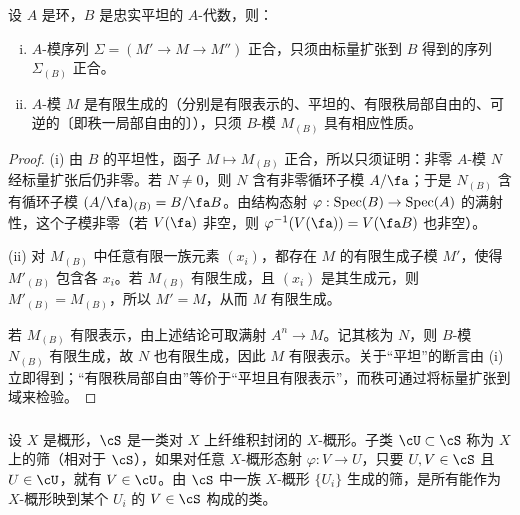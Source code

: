 \begin{proposition}\label{I:1-4-2}
设 $A$ 是环，$B$ 是忠实平坦的 $A$-代数，则：
\begin{enumerate}[(i)]
\item $A$-模序列 $\Sigma=(M'\to M\to M'')$ 正合，只须由标量扩张到 $B$ 得到的序列 $\Sigma_{(B)}$ 正合。
\item $A$-模 $M$ 是有限生成的（分别是有限表示的、平坦的、有限秩局部自由的、可逆的〔即秩一局部自由的〕），只须 $B$-模 $M_{(B)}$ 具有相应性质。
\end{enumerate}
\end{proposition}
\begin{proof}
(i) 由 $B$ 的平坦性，函子 $M\mapsto M_{(B)}$ 正合，所以只须证明：非零 $A$-模 $N$ 经标量扩张后仍非零。若 $N\ne0$，则 $N$ 含有非零循环子模 $A/\fa$；于是 $N_{(B)}$ 含有循环子模 $(A/\fa)_{(B)}=B/\fa B$。由结构态射 $\varphi:\operatorname{Spec}(B)\to\operatorname{Spec}(A)$ 的满射性，这个子模非零（若 $V(\fa)$ 非空，则 $\varphi^{-1}(V(\fa))=V(\fa B)$ 也非空）。

(ii) 对 $M_{(B)}$ 中任意有限一族元素 $(x_i)$，都存在 $M$ 的有限生成子模 $M'$，使得 $M'_{(B)}$ 包含各 $x_i$。若 $M_{(B)}$ 有限生成，且 $(x_i)$ 是其生成元，则 $M'_{(B)}=M_{(B)}$，所以 $M'=M$，从而 $M$ 有限生成。

若 $M_{(B)}$ 有限表示，由上述结论可取满射 $A^n\to M$。记其核为 $N$，则 $B$-模 $N_{(B)}$ 有限生成，故 $N$ 也有限生成，因此 $M$ 有限表示。关于“平坦”的断言由 (i) 立即得到；“有限秩局部自由”等价于“平坦且有限表示”，而秩可通过将标量扩张到域来检验。
\end{proof}

\subsubsection{}\label{I:1-4-3}
设 $X$ 是概形，$\cS$ 是一类对 $X$ 上纤维积封闭的 $X$-概形。子类 $\cU\subset\cS$ 称为 $X$ 上的筛（相对于 $\cS$），如果对任意 $X$-概形态射 $\varphi:V\to U$，只要 $U,V\in\cS$ 且 $U\in\cU$，就有 $V\in\cU$。由 $\cS$ 中一族 $X$-概形 $\{U_i\}$ 生成的筛，是所有能作为 $X$-概形映到某个 $U_i$ 的 $V\in\cS$ 构成的类。

